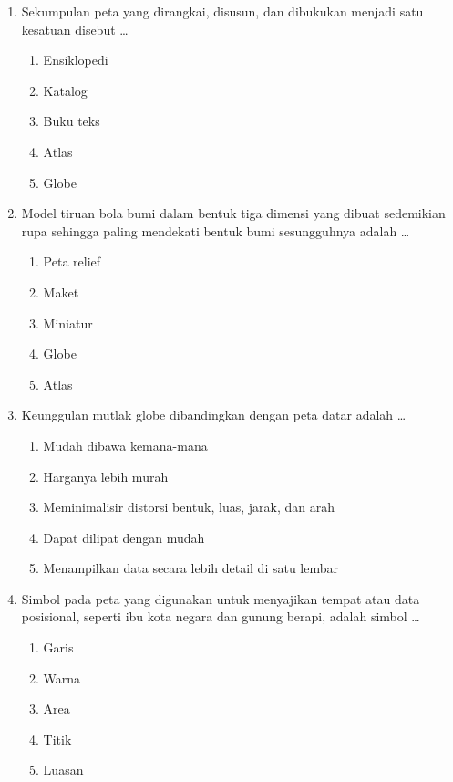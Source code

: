\documentclass[12pt,a4paper]{article}
\begin{document}
\begin{enumerate}[leftmargin=*]
\item Sekumpulan peta yang dirangkai, disusun, dan dibukukan menjadi satu kesatuan disebut \dots
    \begin{enumerate}[label=\alph*.]
        \item Ensiklopedi
        \item Katalog
        \item Buku teks
        \item Atlas
        \item Globe
    \end{enumerate}

\item Model tiruan bola bumi dalam bentuk tiga dimensi yang dibuat sedemikian rupa sehingga paling mendekati bentuk bumi sesungguhnya adalah \dots
    \begin{enumerate}[label=\alph*.]
        \item Peta relief
        \item Maket
        \item Miniatur
        \item Globe
        \item Atlas
    \end{enumerate}

\item Keunggulan mutlak globe dibandingkan dengan peta datar adalah \dots
    \begin{enumerate}[label=\alph*.]
        \item Mudah dibawa kemana-mana
        \item Harganya lebih murah
        \item Meminimalisir distorsi bentuk, luas, jarak, dan arah
        \item Dapat dilipat dengan mudah
        \item Menampilkan data secara lebih detail di satu lembar
    \end{enumerate}

\item Simbol pada peta yang digunakan untuk menyajikan tempat atau data posisional, seperti ibu kota negara dan gunung berapi, adalah simbol \dots
    \begin{enumerate}[label=\alph*.]
        \item Garis
        \item Warna
        \item Area
        \item Titik
        \item Luasan
    \end{enumerate}


\end{enumerate}
\end{document}
